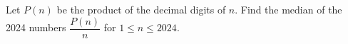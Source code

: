 Let $P(n)$ be the product of the decimal digits of $n$. Find the median of the 2024 numbers $\dfrac{P(n)}{n}$ for $1\le n\le2024$.
